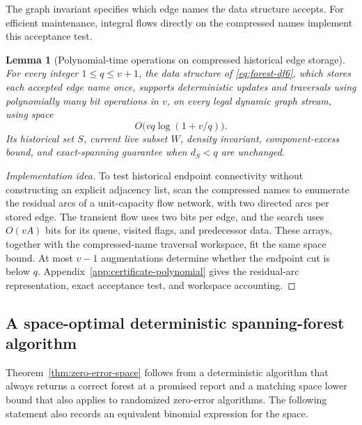 \documentclass[11pt,letterpaper]{article}
\newtheorem{lemma}[theorem]{Lemma}
\numberwithin{equation}{section}
\begin{document}
The graph invariant specifies which edge names the data structure accepts.
For efficient maintenance, integral flows directly on the compressed names implement this acceptance test.

\begin{lemma}[Polynomial-time operations on compressed historical edge storage]
\label{lem:poly-historical-certificate}
For every integer $1\le q\le v+1$, the data structure of \eqref{eq:forest-df6}, which stores each accepted edge name once, supports deterministic updates and traversals using polynomially many bit operations in $v$, on every legal dynamic graph stream, using space
\begin{equation}
O\bigl(vq\log(1+v/q)\bigr).
 \label{eq:forest-pu1}
\end{equation}
Its historical set $S$, current live subset $W$, density invariant, component-excess bound, and exact-spanning guarantee when $d_S<q$ are unchanged.
\end{lemma}
\begin{proof}[Implementation idea]
To test historical endpoint connectivity without constructing an explicit adjacency list, scan the compressed names to enumerate the residual arcs of a unit-capacity flow network, with two directed arcs per stored edge.
The transient flow uses two bits per edge, and the search uses $O(vA)$ bits for its queue, visited flags, and predecessor data.
These arrays, together with the compressed-name traversal workspace, fit the same space bound.
At most $v-1$ augmentations determine whether the endpoint cut is below $q$.
Appendix~\ref{app:certificate-polynomial} gives the residual-arc representation, exact acceptance test, and workspace accounting.
\end{proof}

\subsection{A space-optimal deterministic spanning-forest algorithm}
\label{sec:simple-exact}

Theorem~\ref{thm:zero-error-space} follows from a deterministic algorithm that always returns a correct forest at a promised report and a matching space lower bound that also applies to randomized zero-error algorithms.
The following statement also records an equivalent binomial expression for the space.
\end{document}
